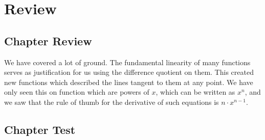 \noindent{}





\newpage

\section{Review}
\subsection{Chapter Review}
We have covered a lot of ground.  The fundamental linearity of many functions serves
as justification for us using the difference quotient on them.  This created new functions which 
described the lines tangent to them at any point.  We have only seen this on function which are
powers of $x$, which can be written as $x^n$, and we saw that the rule of thumb for the
derivative of such equations is $n\cdot x^{n-1}$.
\subsection{Chapter Test}


